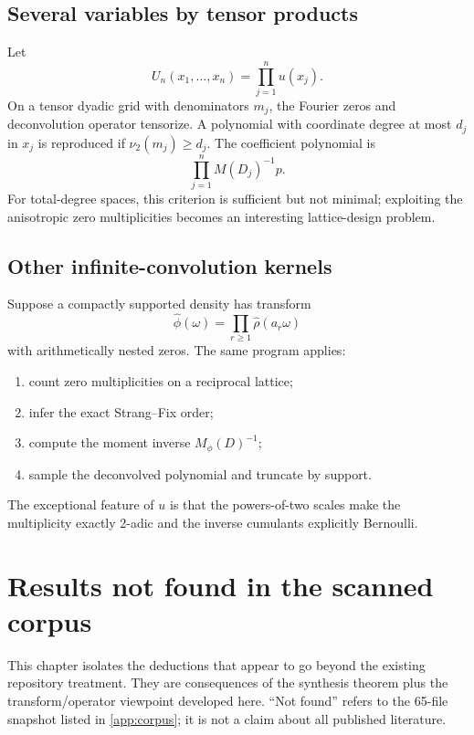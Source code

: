 \documentclass[11pt,oneside]{book}
\newcommand{\CorpusCount}{65}%
\theoremstyle{definition}
\theoremstyle{remark}
\newcommand{\vtwo}{\nu_2}
\begin{document}
\section{Several variables by tensor products}
Let
\begin{equation}
 U_n(x_1,\ldots,x_n)=\prod_{j=1}^{n}u(x_j).
 \label{eq:tensor-up}
\end{equation}
On a tensor dyadic grid with denominators \(m_j\), the Fourier zeros and deconvolution operator tensorize.  A polynomial with coordinate degree at most \(d_j\) in \(x_j\) is reproduced if \(\vtwo(m_j)\ge d_j\).  The coefficient polynomial is
\begin{equation}
 \prod_{j=1}^{n}M(D_j)^{-1}p.
 \label{eq:multivariate-deconvolution}
\end{equation}
For total-degree spaces, this criterion is sufficient but not minimal; exploiting the anisotropic zero multiplicities becomes an interesting lattice-design problem.

\section{Other infinite-convolution kernels}
Suppose a compactly supported density has transform
\begin{equation}
 \widehat\phi(\omega)=\prod_{r\ge1}\widehat\rho(a_r\omega)
 \label{eq:general-infinite-convolution}
\end{equation}
with arithmetically nested zeros.  The same program applies:
\begin{enumerate}
\item count zero multiplicities on a reciprocal lattice;
\item infer the exact Strang--Fix order;
\item compute the moment inverse \(M_\phi(D)^{-1}\);
\item sample the deconvolved polynomial and truncate by support.
\end{enumerate}
The exceptional feature of \(u\) is that the powers-of-two scales make the multiplicity exactly 2-adic and the inverse cumulants explicitly Bernoulli.

\chapter{Results not found in the scanned corpus}
\label{ch:new-results}

This chapter isolates the deductions that appear to go beyond the existing repository treatment.  They are consequences of the synthesis theorem plus the transform/operator viewpoint developed here.  ``Not found'' refers to the \CorpusCount-file snapshot listed in \cref{app:corpus}; it is not a claim about all published literature.
\end{document}
